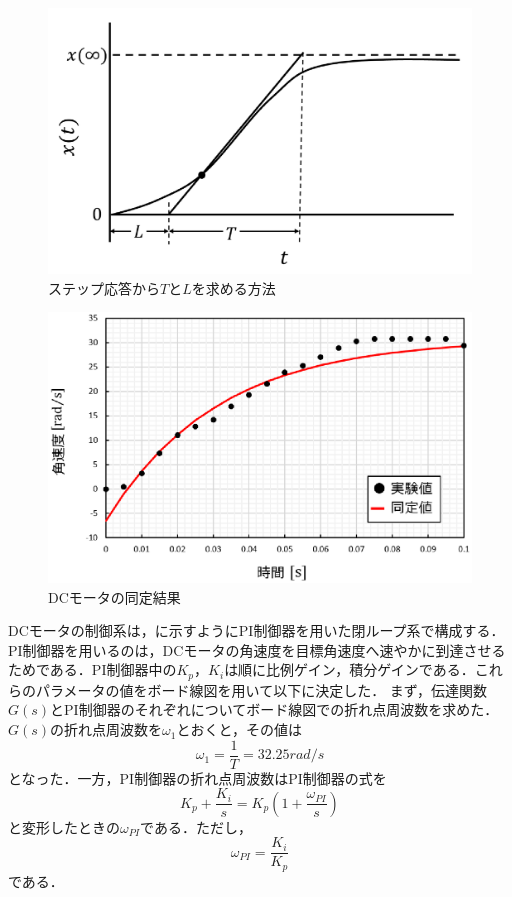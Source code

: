 \begin{figure}[htb]
  \centering
    \includegraphics[width=0.7\hsize]{picture/eps/step_doutei.eps}
  \caption{ステップ応答から$T$と$L$を求める方法}
  \label{fig::step_doutei}
  
\end{figure}

\begin{figure}[htb]
  \centering
    \includegraphics[width=0.7\hsize]{picture/eps/dcmotor_doutei.eps}
  \caption{DCモータの同定結果}
  \label{fig::dcmotor_doutei}
  
\end{figure}

  
DCモータの制御系は，に示すようにPI制御器を用いた閉ループ系で構成する．PI制御器を用いるのは，DCモータの角速度を目標角速度へ速やかに到達させるためである．PI制御器中の$K_{p}$，$K_{i}$は順に比例ゲイン，積分ゲインである．これらのパラメータの値をボード線図を用いて以下に決定した．
まず，伝達関数$G(s)$とPI制御器のそれぞれについてボード線図での折れ点周波数を求めた．$G(s)$の折れ点周波数を$\omega_{1}$とおくと，その値は  
\begin{equation}
 \omega_{1}=\frac{1}{T}=32.25\unit{rad/s}
\end{equation}
となった．一方，PI制御器の折れ点周波数はPI制御器の式を
\begin{equation}
 K_{p}+\frac{K_{i}}{s}=K_{p}(1+\frac{\omega_{PI}}{s})
\end{equation}
と変形したときの$\omega_{PI}$である．ただし，
\begin{equation}
 \omega_{PI}=\frac{K_{i}}{K_{p}}\label{eq::omega_PI}
\end{equation}
である．

